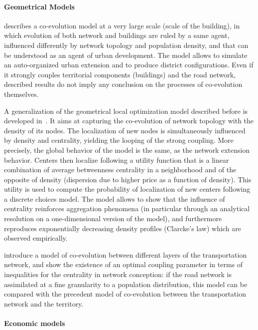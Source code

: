 \paragraph{Geometrical Models}

\cite{achibet2014model} describes a co-evolution model at a very large scale (scale of the building), in which evolution of both network and buildings are ruled by a same agent, influenced differently by network topology and population density, and that can be understood as an agent of urban development. The model allows to simulate an auto-organized urban extension and to produce district configurations. Even if it strongly couples territorial components (buildings) and the road network, described results do not imply any conclusion on the processes of co-evolution themselves.

A generalization of the geometrical local optimization model described before is developed in~\cite{barthelemy2009co}. It aims at capturing the co-evolution of network topology with the density of its nodes. The localization of new nodes is simultaneously influenced by density and centrality, yielding the looping of the strong coupling. More precisely, the global behavior of the model is the same, as the network extension behavior. Centers then localize following a utility function that is a linear combination of average betweenness centrality in a neighborhood and of the opposite of density (dispersion due to higher price as a function of density). This utility is used to compute the probability of localization of new centers following a discrete choices model. The model allows to show that the influence of centrality reinforces aggregation phenomena (in particular through an analytical resolution on a one-dimensional version of the model), and furthermore reproduces exponentially decreasing density profiles (Clarcke's law) which are observed empirically.  


\cite{ding2017heuristic} introduce a model of co-evolution between different layers of the transportation network, and show the existence of an optimal coupling parameter in terms of inequalities for the centrality in network conception: if the road network is assimilated at a fine granularity to a population distribution, this model can be compared with the precedent model of co-evolution between the transportation network and the territory.




\paragraph{Economic models}



